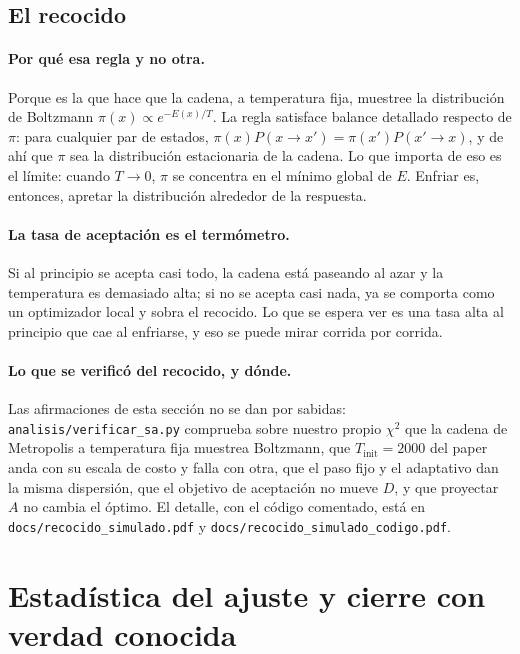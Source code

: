 \documentclass[11pt,a4paper]{article}
\begin{document}
\subsection{El recocido}

\paragraph{Por qué esa regla y no otra.} Porque es la que hace que la cadena,
a temperatura fija, muestree la distribución de Boltzmann
$\pi(x) \propto e^{-E(x)/T}$. La regla satisface balance detallado respecto de
$\pi$: para cualquier par de estados, $\pi(x)P(x\to x') = \pi(x')P(x'\to x)$,
y de ahí que $\pi$ sea la distribución estacionaria de la cadena. Lo que
importa de eso es el límite: cuando $T \to 0$, $\pi$ se concentra en el mínimo
global de $E$. Enfriar es, entonces, apretar la distribución alrededor de la
respuesta.

\paragraph{La tasa de aceptación es el termómetro.} Si al principio se acepta
casi todo, la cadena está paseando al azar y la temperatura es demasiado alta;
si no se acepta casi nada, ya se comporta como un optimizador local y sobra el
recocido. Lo que se espera ver es una tasa alta al principio que cae al
enfriarse, y eso se puede mirar corrida por corrida.

\paragraph{Lo que se verificó del recocido, y dónde.} Las afirmaciones de
esta sección no se dan por sabidas: \texttt{analisis/verificar\_sa.py}
comprueba sobre nuestro propio $\chi^2$ que la cadena de Metropolis a
temperatura fija muestrea Boltzmann, que $T_{\text{init}} = 2000$ del paper
anda con su escala de costo y falla con otra, que el paso fijo y el
adaptativo dan la misma dispersión, que el objetivo de aceptación no mueve
$D$, y que proyectar $A$ no cambia el óptimo. El detalle, con el código
comentado, está en \texttt{docs/recocido\_simulado.pdf} y
\texttt{docs/recocido\_simulado\_codigo.pdf}.

\section{Estadística del ajuste y cierre con verdad conocida}
\label{ap:estadistica}
\label{sec:estadistica}
\end{document}
